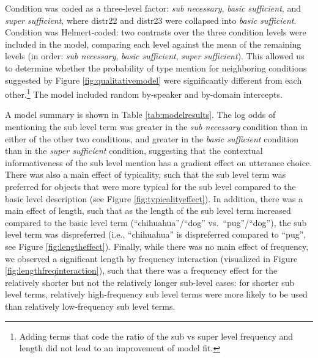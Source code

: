 \documentclass[10pt,letterpaper]{article}
\newcommand{\tableref}[1]{Table \ref{#1}}
\newcommand{\figref}[1]{Figure \ref{#1}}
\begin{document}
Condition was coded as a three-level factor: \emph{sub necessary}, \emph{basic sufficient}, and \emph{super sufficient}, where distr22 and distr23 were collapsed into \emph{basic sufficient}. Condition was Helmert-coded: two contrasts over the three condition levels were included in the model, comparing each level against the mean of the remaining levels (in order: \emph{sub necessary}, \emph{basic sufficient}, \emph{super sufficient}). This allowed us to determine whether the probability of type mention  for neighboring conditions suggested by \figref{fig:qualitativemodel} were significantly different from each other.\footnote{Adding terms that code the ratio of the sub vs super level frequency and length did not lead to an improvement of model fit.} The model included random by-speaker and by-domain intercepts. 



A model summary is shown in \tableref{tab:modelresults}. The log odds of mentioning the sub level term was greater in the \emph{sub necessary} condition than in either of the other two conditions, and greater in the \emph{basic sufficient} condition than in the \emph{super sufficient} condition, suggesting that the contextual informativeness of the sub level mention has a gradient effect on utterance choice. There was also a main effect of typicality, such that the sub level term was preferred for objects that were more typical for the sub level compared to the basic level  description (see \figref{fig:typicalityeffect}). In addition, there was a main effect of length, such that as the length of the sub level term increased compared to the basic level term (``chihuahua''/``dog'' vs.~``pug''/``dog''), the sub level term was dispreferred (i.e., ``chihuahua'' is dispreferred compared to ``pug'', see \figref{fig:lengtheffect}). Finally, while there was no main effect of frequency, we observed a significant length by frequency interaction (visualized in \figref{fig:lengthfreqinteraction}), such that there was a frequency effect for the relatively shorter but not the relatively longer sub-level cases: for shorter sub level terms, relatively high-frequency sub level terms were more likely to be used than relatively low-frequency sub level terms. 
\end{document}
